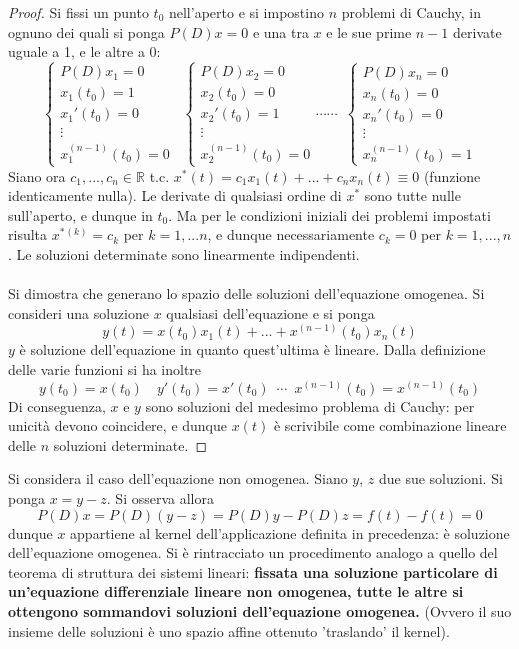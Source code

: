 \documentclass[10pt]{article}
\theoremstyle{plain}
\begin{document}
\begin{proof}
Si fissi un punto $t_0$ nell'aperto e si impostino $n$ problemi di Cauchy, in ognuno dei quali si ponga $P(D)x = 0$ e una tra $x$ e le sue prime $n-1$ derivate uguale a 1, e le altre a 0:
\[
\begin{cases}
P(D)x_1 = 0\\
x_1(t_0) = 1\\
x_1'(t_0) = 0\\
\vdots\\
x_1^{(n-1)}(t_0) = 0
\end{cases} 
\enspace
\begin{cases}
P(D)x_2 = 0\\
x_2(t_0) = 0\\
x_2'(t_0) = 1\\
\vdots\\
x_2^{(n-1)}(t_0) = 0
\end{cases} 
\cdots \cdots \enspace
\begin{cases}
P(D)x_n = 0\\
x_n(t_0) = 0\\
x_n'(t_0) = 0\\
\vdots\\
x_n^{(n-1)}(t_0) = 1
\end{cases} 
\]
Siano ora $c_1, ..., c_n \in \mathbb{R}$ t.c. $x^\ast (t) = c_1 x_1(t) + ... + c_n x_n(t) \equiv 0$ (funzione identicamente nulla). Le derivate di qualsiasi ordine di $x^\ast$ sono tutte nulle sull'aperto, e dunque in $t_0$. Ma per le condizioni iniziali dei problemi impostati risulta $x^\ast{}^{(k)} = c_k$ per $k = 1, ...n$, e dunque necessariamente $c_k = 0$ per $k = 1, ..., n$. Le soluzioni determinate sono linearmente indipendenti.
\\~\\Si dimostra che generano lo spazio delle soluzioni dell'equazione omogenea. Si consideri una soluzione $x$ qualsiasi dell'equazione e si ponga
\[y(t) = x(t_0) x_1(t) + ... + x^{(n-1)}(t_0) x_n(t)\]
$y$ è soluzione dell'equazione in quanto quest'ultima è lineare. Dalla definizione delle varie funzioni si ha inoltre
\[y(t_0) = x(t_0) \quad y'(t_0) = x'(t_0) \enspace \cdots \enspace x^{(n-1)}(t_0) = x^{(n-1)}(t_0)\]
Di conseguenza, $x$ e $y$ sono soluzioni del medesimo problema di Cauchy: per unicità devono coincidere, e dunque $x(t)$ è scrivibile come combinazione lineare delle $n$ soluzioni determinate.
\end{proof}
Si considera il caso dell'equazione non omogenea. Siano $y$, $z$ due sue soluzioni. Si ponga $x = y - z$. Si osserva allora
\[P(D)x = P(D)(y-z) = P(D)y - P(D)z = f(t) - f(t) = 0\]
dunque $x$ appartiene al kernel dell'applicazione definita in precedenza: è soluzione dell'equazione omogenea. Si è rintracciato un procedimento analogo a quello del teorema di struttura dei sistemi lineari: \textbf{fissata una soluzione particolare di un'equazione differenziale lineare non omogenea, tutte le altre si ottengono sommandovi soluzioni dell'equazione omogenea.} (Ovvero il suo insieme delle soluzioni è uno spazio affine ottenuto 'traslando' il kernel).
\end{document}
